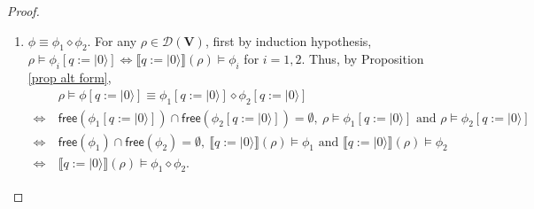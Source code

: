 \documentclass[conference,compsoc, 10pt]{IEEEtran}
\newcommand {\qI} {{q:=|0\rangle}}
\newcommand {\cD } {{\mathcal{D}}}
\newcommand {\free }[1] {{\mathsf{free}\left(#1\right)}}
\newcommand {\vars } {\mathbf{V}}
\newcommand {\sem}[1] {\llbracket#1\rrbracket}
\newcommand{\sd}{\diamond}%
\begin{document}
\begin{appendices}
\begin{proof}
\begin{enumerate}
				\item $\phi \equiv \phi_1\sd\phi_2$. For any $\rho\in\cD(\vars)$, first by induction hypothesis, $\rho\models\phi_i[\qI]\Leftrightarrow\sem{\qI}(\rho)\models\phi_i$ for $i = 1,2$. Thus, by Proposition \ref{prop alt form},
				\begin{align*}
				&\rho\models\phi[\qI] \equiv \phi_1[\qI]\sd\phi_2[\qI] \\
				\Longleftrightarrow\ &\free{\phi_1[\qI]}\cap\free{\phi_2[\qI]} = \emptyset,\ \rho\models\phi_1[\qI]\text{\ and\ } \rho\models\phi_2[\qI] \\
				\Longleftrightarrow\ &\free{\phi_1}\cap\free{\phi_2} = \emptyset,\ \sem{\qI}(\rho)\models\phi_1\text{\ and\ } \sem{\qI}(\rho)\models\phi_2 \\
				\Longleftrightarrow\ &\sem{\qI}(\rho)\models\phi_1\sd\phi_2. 
				\end{align*}
				

\end{enumerate}
\end{proof}
\end{appendices}
\end{document}
